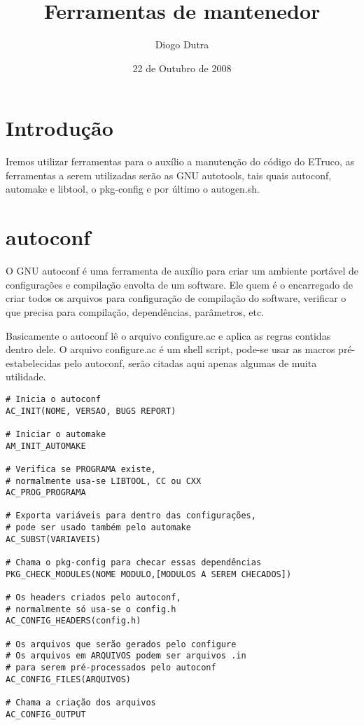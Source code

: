 \documentclass[]{article}
\title{Ferramentas de mantenedor}
\author{Diogo Dutra}
\date{22 de Outubro de 2008}
\begin{document}
\maketitle
\tableofcontents

\section{Introdução}
Iremos utilizar ferramentas para o auxílio a manutenção do código do ETruco, as ferramentas a serem utilizadas serão as GNU autotools, tais quais autoconf, automake e libtool, o pkg-config e por último o autogen.sh.

\section{autoconf}
O GNU autoconf é uma ferramenta de auxílio para criar um ambiente portável de configurações e compilação envolta de um software.
Ele quem é o encarregado de criar todos os arquivos para configuração de compilação do software, verificar o que precisa para compilação, dependências, parâmetros, etc.

Basicamente o autoconf lê o arquivo configure.ac e aplica as regras contidas dentro dele.
O arquivo configure.ac é um shell script, pode-se usar as macros pré-estabelecidas pelo autoconf, serão citadas aqui apenas algumas de muita utilidade.
\begin{verbatim}
# Inicia o autoconf
AC_INIT(NOME, VERSAO, BUGS REPORT)

# Iniciar o automake
AM_INIT_AUTOMAKE

# Verifica se PROGRAMA existe,
# normalmente usa-se LIBTOOL, CC ou CXX
AC_PROG_PROGRAMA

# Exporta variáveis para dentro das configurações,
# pode ser usado também pelo automake
AC_SUBST(VARIAVEIS)

# Chama o pkg-config para checar essas dependências
PKG_CHECK_MODULES(NOME MODULO,[MODULOS A SEREM CHECADOS])

# Os headers criados pelo autoconf,
# normalmente só usa-se o config.h
AC_CONFIG_HEADERS(config.h)

# Os arquivos que serão gerados pelo configure
# Os arquivos em ARQUIVOS podem ser arquivos .in
# para serem pré-processados pelo autoconf
AC_CONFIG_FILES(ARQUIVOS)

# Chama a criação dos arquivos
AC_CONFIG_OUTPUT
\end{verbatim}
\end{document}
